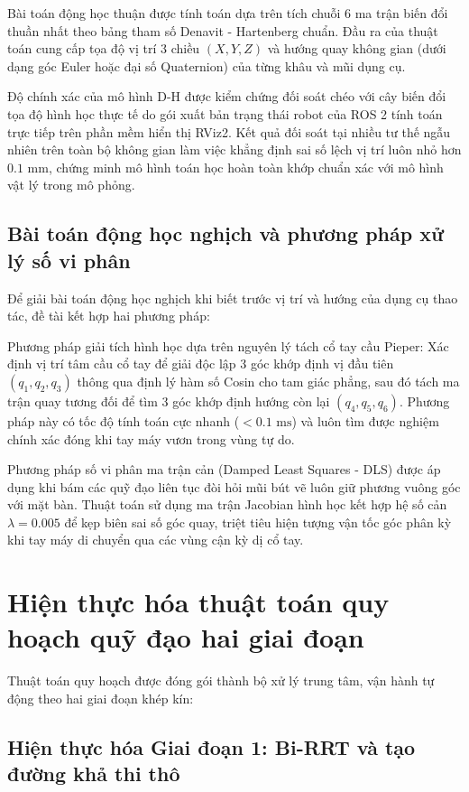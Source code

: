 Bài toán động học thuận được tính toán dựa trên tích chuỗi 6 ma trận biến đổi thuần nhất theo bảng tham số Denavit - Hartenberg chuẩn. Đầu ra của thuật toán cung cấp tọa độ vị trí 3 chiều $(X, Y, Z)$ và hướng quay không gian (dưới dạng góc Euler hoặc đại số Quaternion) của từng khâu và mũi dụng cụ.

Độ chính xác của mô hình D-H được kiểm chứng đối soát chéo với cây biến đổi tọa độ hình học thực tế do gói xuất bản trạng thái robot của ROS 2 tính toán trực tiếp trên phần mềm hiển thị RViz2. Kết quả đối soát tại nhiều tư thế ngẫu nhiên trên toàn bộ không gian làm việc khẳng định sai số lệch vị trí luôn nhỏ hơn $0.1\text{ mm}$, chứng minh mô hình toán học hoàn toàn khớp chuẩn xác với mô hình vật lý trong mô phỏng.

\subsection{Bài toán động học nghịch và phương pháp xử lý số vi phân}

Để giải bài toán động học nghịch khi biết trước vị trí và hướng của dụng cụ thao tác, đề tài kết hợp hai phương pháp:

Phương pháp giải tích hình học dựa trên nguyên lý tách cổ tay cầu Pieper: Xác định vị trí tâm cầu cổ tay để giải độc lập 3 góc khớp định vị đầu tiên $(q_1, q_2, q_3)$ thông qua định lý hàm số Cosin cho tam giác phẳng, sau đó tách ma trận quay tương đối để tìm 3 góc khớp định hướng còn lại $(q_4, q_5, q_6)$. Phương pháp này có tốc độ tính toán cực nhanh ($< 0.1\text{ ms}$) và luôn tìm được nghiệm chính xác đóng khi tay máy vươn trong vùng tự do.

Phương pháp số vi phân ma trận cản (Damped Least Squares - DLS) được áp dụng khi bám các quỹ đạo liên tục đòi hỏi mũi bút vẽ luôn giữ phương vuông góc với mặt bàn. Thuật toán sử dụng ma trận Jacobian hình học kết hợp hệ số cản $\lambda = 0.005$ để kẹp biên sai số góc quay, triệt tiêu hiện tượng vận tốc góc phân kỳ khi tay máy di chuyển qua các vùng cận kỳ dị cổ tay.

\section{Hiện thực hóa thuật toán quy hoạch quỹ đạo hai giai đoạn}
\label{sec:algorithm_implementation_steps}

Thuật toán quy hoạch được đóng gói thành bộ xử lý trung tâm, vận hành tự động theo hai giai đoạn khép kín:

\subsection{Hiện thực hóa Giai đoạn 1: Bi-RRT và tạo đường khả thi thô}

